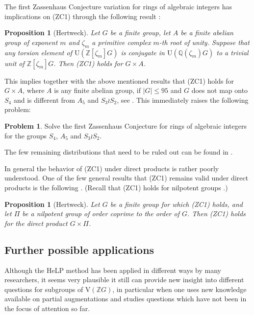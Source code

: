 \documentclass[10pt,a4paper,reqno]{amsart}
\newtheorem{proposition}[theorem]{Proposition}
\theoremstyle{definition}
\newtheorem{problem}[theorem]{Problem}
\theoremstyle{remark}
\newcommand{\U}{\mathrm{U}}
\newcommand{\V}{\mathrm{V}}
\newcommand{\ZZ}{\mathbb{Z}}
\newcommand{\QQ}{\mathbb{Q}}
\begin{document}
The first Zassenhaus Conjecture variation for rings of algebraic integers has implications on (ZC1) through the following result \cite[Proposition~8.2]{Her08}:
        
\begin{proposition}[Hertweck]\label{prop:Hertweck_reduction} Let $G$ be a finite
  group, let $A$ be a finite abelian group of exponent $m$ and $\zeta_m$ a primitive complex $m$-th root of unity.
Suppose that any torsion element of $\U(\ZZ[\zeta_m]G)$ is conjugate in $\U(\QQ(\zeta_m)G)$ to a trivial unit of $\ZZ[\zeta_m]G$. Then (ZC1) holds for $G \times A$. \end{proposition}

 
 This implies together with the above mentioned results that (ZC1) holds for $G \times A$, where $A$ is any finite abelian group, if $|G| \leqslant 95$ and $G$ does not map onto $S_4$ and is different from $A_5$ and $S_3 \wr S_2$, see \cite[Proposition~5.8]{BKS20}. This immediately raises the following problem:
 
 
 \begin{problem} Solve the first Zassenhaus Conjecture for rings of algebraic integers for the groups $S_4$, $A_5$ and $S_3 \wr S_2$.\end{problem}
 
The few remaining distributions that need to be ruled out can be found in \cite[Section~5]{BKS20}.
 
 In general the behavior of (ZC1) under direct products is rather poorly understood. One of the few general results that (ZC1) remains valid under direct products is the following \cite[Proposition~8.1]{Her08}. (Recall that (ZC1) holds for nilpotent groups \cite{Wei91}.)
 
\begin{proposition}[Hertweck] Let $G$ be a finite group for which (ZC1) holds, and let $\Pi$ be a nilpotent group of order coprime to the order of $G$. Then (ZC1) holds for the direct product $G \times \Pi$.
 \end{proposition}
 

 
 
 
\subsection{Further possible applications}

Although the HeLP method has been applied in different ways by many researchers, it seems very plausible it still can provide new insight into different questions for subgroups of $\V(\ZZ G)$, in particular when one uses new knowledge available on partial augmentations and studies questions which have not been in the focus of attention so far.
\end{document}
